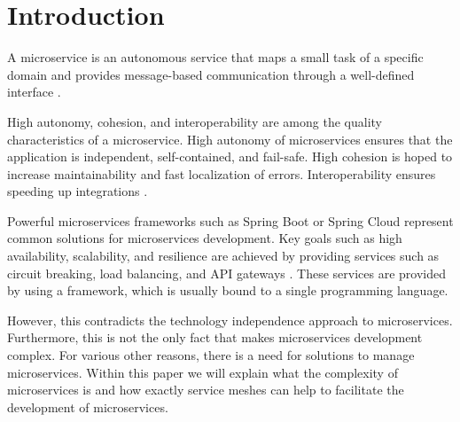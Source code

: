 \section{Introduction}

A microservice is an autonomous service that maps a small task of a specific domain and provides message-based communication through a well-defined interface \cite[p. 18]{microservices-general}.

High autonomy, cohesion, and interoperability are among the quality characteristics of a microservice. High autonomy of microservices ensures that the application is independent, self-contained, and fail-safe. High cohesion is hoped to increase maintainability and fast localization of errors. Interoperability ensures speeding up integrations \cite[p. 208 ff.]{microservices-general}.

Powerful microservices frameworks such as Spring Boot or Spring Cloud represent common solutions for microservices development. Key goals such as high availability, scalability, and resilience are achieved by providing services such as circuit breaking, load balancing, and API gateways \cite{spring-cloud}. These services are provided by using a framework, which is usually bound to a single programming language.

However, this contradicts the technology independence approach \cite{from-monolith} to microservices. Furthermore, this is not the only fact that makes microservices development complex. For various other reasons, there is a need for solutions to manage microservices. Within this paper we will explain what the complexity of microservices is and how exactly service meshes can help to facilitate the development of microservices. 